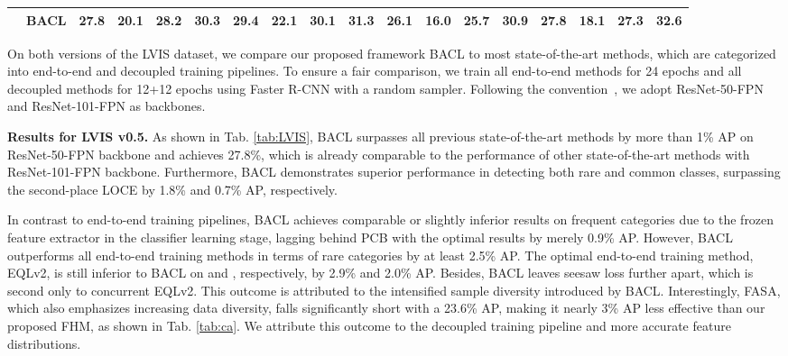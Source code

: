 \documentclass[lettersize,journal]{IEEEtran}
\begin{document}
\begin{table*}[t]
{\begin{tabular}{c|c|cccccccc|cccccccc}
                                     & BACL                     & \textbf{27.8} & \textbf{20.1} & \textbf{28.2} & \multicolumn{1}{c|}{30.3}          & \textbf{29.4} & \textbf{22.1} & \textbf{30.1} & 31.3          & \multicolumn{1}{c|}{\textbf{26.1}} & \textbf{16.0} & \textbf{25.7} & \multicolumn{1}{c|}{30.9}          & \multicolumn{1}{c|}{\textbf{27.8}} & 18.1          & \textbf{27.3} & 32.6          \\ \hline
        \end{tabular}}
    \label{tab:LVIS}
    \vspace{-4mm}
\end{table*}

On both versions of the LVIS dataset, we compare our proposed framework BACL to most state-of-the-art methods, which are categorized into end-to-end and decoupled training pipelines.
To ensure a fair comparison, we train all end-to-end methods for 24 epochs and all decoupled methods for 12+12 epochs using Faster R-CNN with a random sampler.
Following the convention~\cite{tan2021equalization,feng2021exploring}, we adopt ResNet-50-FPN and ResNet-101-FPN as backbones.




\noindent\textbf{Results for LVIS v0.5.}
As shown in Tab. \ref{tab:LVIS}, BACL surpasses all previous state-of-the-art methods by more than 1\% AP on ResNet-50-FPN backbone and achieves 27.8\%, which is already comparable to the performance of other state-of-the-art methods with ResNet-101-FPN backbone.
Furthermore, BACL demonstrates superior performance in detecting both rare and common classes, surpassing the second-place LOCE by 1.8\% and 0.7\% AP, respectively.

In contrast to end-to-end training pipelines, BACL achieves comparable or slightly inferior results on frequent categories due to the frozen feature extractor in the classifier learning stage, lagging behind PCB with the optimal results by merely 0.9\% AP.
However, BACL outperforms all end-to-end training methods in terms of rare categories by at least 2.5\% AP.
The optimal end-to-end training method, EQLv2, is still inferior to BACL on  and , respectively, by 2.9\% and 2.0\% AP.
Besides, BACL leaves seesaw loss further apart, which is second only to concurrent EQLv2.
This outcome is attributed to the intensified sample diversity introduced by BACL.
Interestingly, FASA, which also emphasizes increasing data diversity, falls significantly short with a 23.6\% AP, making it nearly 3\% AP less effective than our proposed FHM, as shown in Tab. \ref{tab:ca}.
We attribute this outcome to the decoupled training pipeline and more accurate feature distributions.
\end{document}
